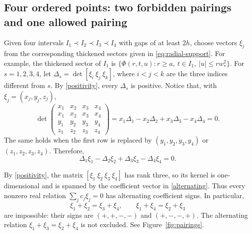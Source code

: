 \documentclass{amsart}
\numberwithin{equation}{section}
\begin{document}
\subsection{Four ordered points: two forbidden pairings and one allowed pairing}

Given four intervals $I_1\prec I_2\prec I_3\prec I_4$ with gaps of at least $2h$, choose vectors $\xi_j$ from the corresponding thickened sectors given in \eqref{eq:radial-support}.
For example, the thickened sector of $I_1$ is $\{\Phi(r,t,u):r\geq a,\ t\in I_1,\ |u|\leq r w_*^2\}$.
For $s=1,2,3,4$, let $\Delta_s=\det[\xi_i\ \xi_j\ \xi_k]$, where $i<j<k$ are the three indices different from $s$. 
By \eqref{positivity}, every $\Delta_s$ is positive. 
Notice that, with $\xi_j=(x_j,y_j,z_j)$,
\[
    \det\begin{pmatrix}
      x_1&x_2&x_3&x_4\\
      x_1&x_2&x_3&x_4\\
      y_1&y_2&y_3&y_4\\
      z_1&z_2&z_3&z_4
    \end{pmatrix}
    =x_1\Delta_1-x_2\Delta_2+x_3\Delta_3-x_4\Delta_4=0.
\]
The same holds when the first row is replaced by
$(y_1,y_2,y_3,y_4)$ or $(z_1,z_2,z_3,z_4)$. Therefore,
\begin{equation}
\label{alternating}
    \Delta_1\xi_1-\Delta_2\xi_2+\Delta_3\xi_3-\Delta_4\xi_4=0.
\end{equation}

By \eqref{positivity}, the matrix $[\xi_1\ \xi_2\ \xi_3\ \xi_4]$ has rank three, so its kernel is one-dimensional and is spanned by the coefficient vector in \eqref{alternating}. 
Thus every nonzero real relation $\sum_j c_j\xi_j=0$ has alternating coefficient signs.
In particular,
\[
    \xi_1+\xi_2=\xi_3+\xi_4,
    \qquad
    \xi_1+\xi_4=\xi_2+\xi_3
\]
are impossible: their signs are $(+,+,-,-)$ and $(+,-,-,+)$.
The alternating relation $\xi_1+\xi_3=\xi_2+\xi_4$ is not excluded.
See Figure~\ref{fig:pairings}.
\end{document}
